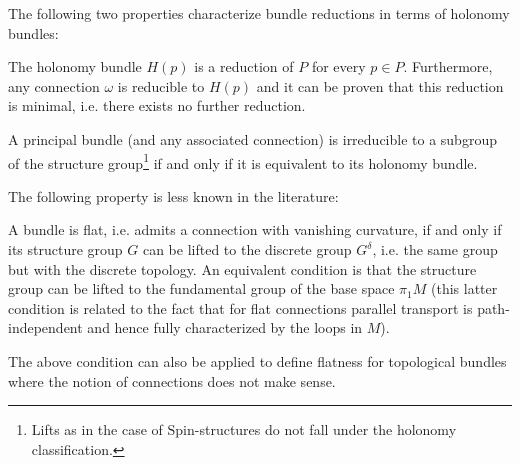     The following two properties characterize bundle reductions in terms of holonomy bundles:
    \begin{property}
        The holonomy bundle $H(p)$ is a reduction of $P$ for every $p\in P$. Furthermore, any connection $\omega$ is reducible to $H(p)$ and it can be proven that this reduction is minimal, i.e. there exists no further reduction.
    \end{property}
    \begin{result}\label{diff:reducible_holonomy}
        A principal bundle (and any associated connection) is irreducible to a subgroup of the structure group\footnote{Lifts as in the case of $\text{Spin}$-structures do not fall under the holonomy classification.} if and only if it is equivalent to its holonomy bundle.
    \end{result}

    The following property is less known in the literature:
    \begin{property}\label{diff:flat_connection_cohomology}
        A bundle is flat, i.e. admits a connection with vanishing curvature, if and only if its structure group $G$ can be lifted to the discrete group $G^\delta$, i.e. the same group but with the discrete topology. An equivalent condition is that the structure group can be lifted to the fundamental group of the base space $\pi_1M$ (this latter condition is related to the fact that for flat connections parallel transport is path-independent and hence fully characterized by the loops in $M$).
    \end{property}
    \begin{remark}
        The above condition can also be applied to define flatness for topological bundles where the notion of connections does not make sense.
    \end{remark}
